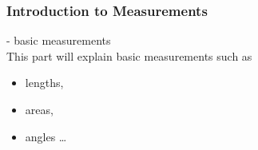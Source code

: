 \begin{module}[id=intromeasurements]
\begin{frame}
  \frametitle{Introduction to Measurements}
  - basic measurements\\
  This part will explain basic measurements such as
  \begin{itemize}
    \item lengths,
    \item areas,
    \item angles \ldots
  \end{itemize}
\end{frame}
\end{module}
